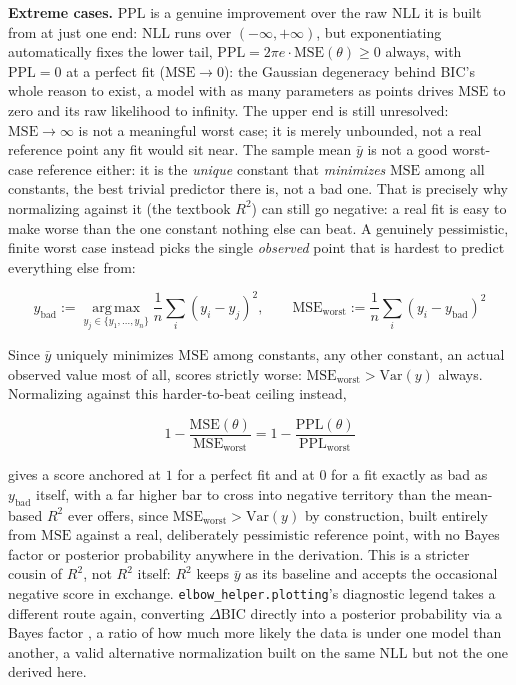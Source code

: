 \documentclass[11pt]{article}
\newcommand{\code}[1]{\texttt{#1}}
\begin{document}
\textbf{Extreme cases.} $\mathrm{PPL}$ is a genuine
improvement over the raw $\mathrm{NLL}$ it is built from at just one
end: $\mathrm{NLL}$ runs over $(-\infty, +\infty)$, but exponentiating
automatically fixes the lower tail, $\mathrm{PPL} = 2\pi e \cdot
\mathrm{MSE}(\theta) \ge 0$ always, with $\mathrm{PPL} = 0$ at a perfect
fit ($\mathrm{MSE} \to 0$): the Gaussian degeneracy behind BIC's whole
reason to exist, a model with as many parameters as points drives
$\mathrm{MSE}$ to zero and its raw likelihood to infinity. The upper end
is still unresolved: $\mathrm{MSE} \to \infty$ is not a meaningful worst
case; it is merely unbounded, not a real reference point any fit would
sit near. The sample
mean $\bar y$ is not a good worst-case reference either: it is the
\emph{unique} constant that \emph{minimizes} $\mathrm{MSE}$ among all
constants, the best trivial predictor there is, not a bad one. That is
precisely why normalizing against it (the textbook $R^2$) can still go
negative: a real fit is easy to make worse than the one constant nothing
else can beat. A genuinely pessimistic, finite worst case instead picks
the single \emph{observed} point that is hardest to predict everything
else from:

\begin{equation}
y_{\text{bad}} := \operatorname*{arg\,max}_{y_j \in \{y_1,\dots,y_n\}}
\frac{1}{n}\sum_i (y_i - y_j)^2, \qquad
\mathrm{MSE}_{\text{worst}} := \frac{1}{n}\sum_i (y_i - y_{\text{bad}})^2
\end{equation}

Since $\bar y$ uniquely minimizes $\mathrm{MSE}$ among constants, any other
constant, an actual observed value most of all, scores strictly worse:
$\mathrm{MSE}_{\text{worst}} > \mathrm{Var}(y)$ always. Normalizing against
this harder-to-beat ceiling instead,

\begin{equation}
1 - \frac{\mathrm{MSE}(\theta)}{\mathrm{MSE}_{\text{worst}}} = 1 - \frac{\mathrm{PPL}(\theta)}{\mathrm{PPL}_{\text{worst}}}
\end{equation}

gives a score anchored at $1$ for a perfect fit and at $0$ for a fit
exactly as bad as $y_{\text{bad}}$ itself, with a far higher bar to cross
into negative territory than the mean-based $R^2$ ever offers, since
$\mathrm{MSE}_{\text{worst}} > \mathrm{Var}(y)$ by construction, built
entirely from $\mathrm{MSE}$ against a real, deliberately pessimistic
reference point, with no Bayes factor or posterior probability anywhere
in the derivation. This is a stricter cousin of $R^2$, not $R^2$ itself: $R^2$ keeps
$\bar y$ as its baseline and accepts the occasional negative score in
exchange. \code{elbow\_helper.plotting}'s diagnostic legend takes
a different route again, converting $\Delta\mathrm{BIC}$ directly into a
posterior probability via a Bayes factor \citep{kassraftery1995}, a ratio
of how much more likely the data is under one model than another, a
valid alternative normalization built on the same $\mathrm{NLL}$ but not
the one derived here.
\end{document}
